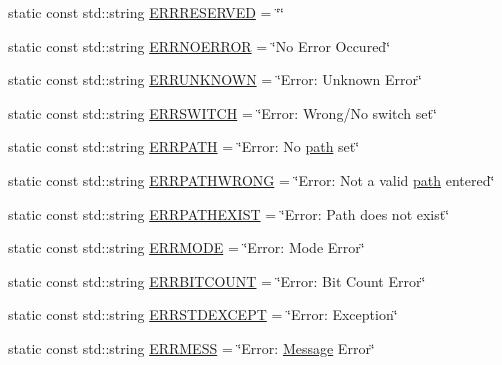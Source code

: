 \begin{DoxyCompactItemize}
\item 
static const std\+::string \mbox{\hyperlink{classErrorHandler_a737a712190c5e9dcbd11230bd3c2eaca}{E\+R\+R\+R\+E\+S\+E\+R\+V\+ED}} = \char`\"{}\char`\"{}
\item 
static const std\+::string \mbox{\hyperlink{classErrorHandler_ae805d5476c00a9687c15183268d4e2dd}{E\+R\+R\+N\+O\+E\+R\+R\+OR}} = \char`\"{}No Error Occured\char`\"{}
\item 
static const std\+::string \mbox{\hyperlink{classErrorHandler_a9530db091517e099bc9bad620390c31d}{E\+R\+R\+U\+N\+K\+N\+O\+WN}} = \char`\"{}Error\+: Unknown Error\char`\"{}
\item 
static const std\+::string \mbox{\hyperlink{classErrorHandler_a7d2d47caa057173f4a55e92fd62e9fb8}{E\+R\+R\+S\+W\+I\+T\+CH}} = \char`\"{}Error\+: Wrong/No switch set\char`\"{}
\item 
static const std\+::string \mbox{\hyperlink{classErrorHandler_adef43ff4191a79c860f085a59b7d6f6a}{E\+R\+R\+P\+A\+TH}} = \char`\"{}Error\+: No \mbox{\hyperlink{classErrorHandler_aeabbc987b7eaa01b6d006b55b4e00574}{path}} set\char`\"{}
\item 
static const std\+::string \mbox{\hyperlink{classErrorHandler_aaab6de85cae710a56ae6324b06a42179}{E\+R\+R\+P\+A\+T\+H\+W\+R\+O\+NG}} = \char`\"{}Error\+: Not a valid \mbox{\hyperlink{classErrorHandler_aeabbc987b7eaa01b6d006b55b4e00574}{path}} entered\char`\"{}
\item 
static const std\+::string \mbox{\hyperlink{classErrorHandler_a18de05a2e4538d1417f22b02bbb763bf}{E\+R\+R\+P\+A\+T\+H\+E\+X\+I\+ST}} = \char`\"{}Error\+: Path does not exist\char`\"{}
\item 
static const std\+::string \mbox{\hyperlink{classErrorHandler_a88183b288608b1f8c54c84a27d5f6a40}{E\+R\+R\+M\+O\+DE}} = \char`\"{}Error\+: Mode Error\char`\"{}
\item 
static const std\+::string \mbox{\hyperlink{classErrorHandler_aaca2b9c33a1ad2bcc5d311cb4e5ca8f8}{E\+R\+R\+B\+I\+T\+C\+O\+U\+NT}} = \char`\"{}Error\+: Bit Count Error\char`\"{}
\item 
static const std\+::string \mbox{\hyperlink{classErrorHandler_ae554a9167e1821ba8b49fc3e0bad3288}{E\+R\+R\+S\+T\+D\+E\+X\+C\+E\+PT}} = \char`\"{}Error\+: Exception\char`\"{}
\item 
static const std\+::string \mbox{\hyperlink{classErrorHandler_a921789ddcecc00b88f61b58d8adeae3e}{E\+R\+R\+M\+E\+SS}} = \char`\"{}Error\+: \mbox{\hyperlink{classMessage}{Message}} Error\char`\"{}
\item 

\end{DoxyCompactItemize}
